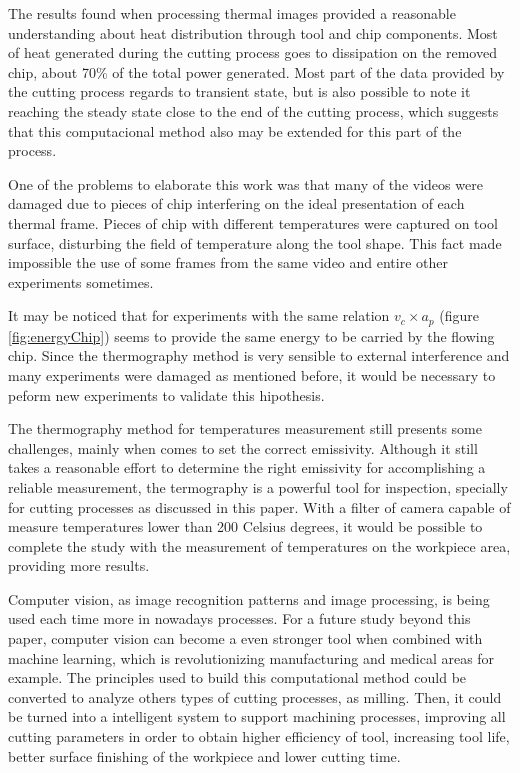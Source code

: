 The results found when processing thermal images provided a reasonable understanding about heat distribution through tool and chip components. Most of heat generated during the cutting process goes to dissipation on the removed chip, about 70\% of the total power generated. Most part of the data provided by the cutting process regards to transient state, but is also possible to note it reaching the steady state close to the end of the cutting process, which suggests that this computacional method also may be extended for this part of the process.

One of the problems to elaborate this work was that many of the videos were damaged due to pieces of chip interfering on the ideal presentation of each thermal frame. Pieces of chip with different temperatures were captured on tool surface, disturbing the field of temperature along the tool shape. This fact made impossible the use of some frames from the same video and entire other experiments sometimes.

It may be noticed that for experiments with the same relation $v_{c}\times a_{p}$ (figure \ref{fig:energyChip}) seems to provide the same energy to be carried by the flowing chip. Since the thermography method is very sensible to external interference and many experiments were damaged as mentioned before, it would be necessary to peform new experiments to validate this hipothesis.

The thermography method for temperatures measurement still presents some challenges, mainly when comes to set the correct emissivity. Although it still takes a reasonable effort to determine the right emissivity for accomplishing a reliable measurement, the termography is a powerful tool for inspection, specially for cutting processes as discussed in this paper. With a filter of camera capable of measure temperatures lower than 200 Celsius degrees, it would be possible to complete the study with the measurement of temperatures on the workpiece area, providing more results.

Computer vision, as image recognition patterns and image processing, is being used each time more in nowadays processes. For a future study beyond this paper, computer vision can become a even stronger tool when combined with machine learning, which is revolutionizing manufacturing and medical areas for example. The principles used to build this computational method could be converted to analyze others types of cutting processes, as milling. Then, it could be turned into a intelligent system to support machining processes, improving all cutting parameters in order to obtain higher efficiency of tool, increasing tool life, better surface finishing of the workpiece and lower cutting time.